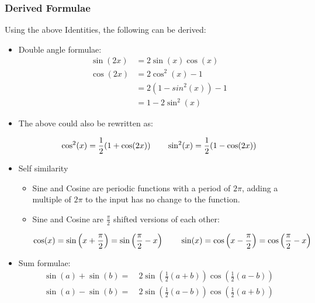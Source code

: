 \documentclass{article}
\begin{document}
\subsubsection{Derived Formulae}
Using the above Identities, the following can be derived:
\begin{itemize}
  \item Double angle formulae:
    \begin{align*}
      \sin(2x) &= 2\sin(x)\cos(x)\\
      \cos(2x) &= 2\cos^{2}(x) - 1\\
               &= 2(1 - sin^{2}(x)) - 1\\
               &= 1 - 2\sin^{2}(x)
    \end{align*}
  \item The above could also be rewritten as:
    \begin{multicols}{2}
      \begin{equation*}
        \cos^{2}(x) = \frac{1}{2}(1 + \cos(2x))\\
        \qquad\sin^{2}(x) = \frac{1}{2}(1 - \cos(2x))
      \end{equation*}
    \end{multicols}
  \item Self similarity
    \begin{itemize}
      \item Sine and Cosine are periodic functions with a period of $2\pi$, adding a multiple of $2\pi$ to the input has no change to the function.
      \item Sine and Cosine are $\frac{\pi}{2}$ shifted versions of each other:
      \begin{multicols}{2}
        \begin{equation*}
          \cos(x) = \sin\left(x + \frac{\pi}{2}\right) = \sin\left(\frac{\pi}{2} - x\right)\\
          \qquad\sin(x) = \cos\left(x - \frac{\pi}{2}\right) = \cos\left(\frac{\pi}{2} - x\right)
        \end{equation*}
      \end{multicols}
    \end{itemize}
  \item Sum formulae:
    \begin{align*}
      \sin(a) + \sin(b) =\ &2\sin\left(\frac{1}{2}(a + b)\right)\cos\left(\frac{1}{2}(a - b)\right)\\
      \sin(a) - \sin(b) =\ &2\sin\left(\frac{1}{2}(a - b)\right)\cos\left(\frac{1}{2}(a + b)\right)\\

\end{align*}
\end{itemize}
\end{document}
